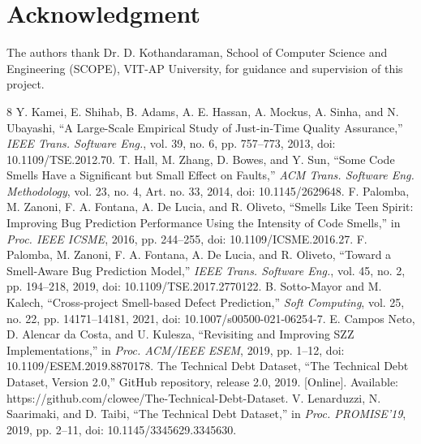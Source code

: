 \documentclass[conference]{IEEEtran}
\begin{document}
\section*{Acknowledgment}
The authors thank Dr. D. Kothandaraman, School of Computer Science and Engineering (SCOPE), VIT-AP University, for guidance and supervision of this project.

\begin{thebibliography}{8}
 Y. Kamei, E. Shihab, B. Adams, A. E. Hassan, A. Mockus, A. Sinha, and N. Ubayashi, ``A Large-Scale Empirical Study of Just-in-Time Quality Assurance,'' \emph{IEEE Trans. Software Eng.}, vol. 39, no. 6, pp. 757--773, 2013, doi: 10.1109/TSE.2012.70.
 T. Hall, M. Zhang, D. Bowes, and Y. Sun, ``Some Code Smells Have a Significant but Small Effect on Faults,'' \emph{ACM Trans. Software Eng. Methodology}, vol. 23, no. 4, Art. no. 33, 2014, doi: 10.1145/2629648.
 F. Palomba, M. Zanoni, F. A. Fontana, A. De Lucia, and R. Oliveto, ``Smells Like Teen Spirit: Improving Bug Prediction Performance Using the Intensity of Code Smells,'' in \emph{Proc. IEEE ICSME}, 2016, pp. 244--255, doi: 10.1109/ICSME.2016.27.
 F. Palomba, M. Zanoni, F. A. Fontana, A. De Lucia, and R. Oliveto, ``Toward a Smell-Aware Bug Prediction Model,'' \emph{IEEE Trans. Software Eng.}, vol. 45, no. 2, pp. 194--218, 2019, doi: 10.1109/TSE.2017.2770122.
 B. Sotto-Mayor and M. Kalech, ``Cross-project Smell-based Defect Prediction,'' \emph{Soft Computing}, vol. 25, no. 22, pp. 14171--14181, 2021, doi: 10.1007/s00500-021-06254-7.
 E. Campos Neto, D. Alencar da Costa, and U. Kulesza, ``Revisiting and Improving SZZ Implementations,'' in \emph{Proc. ACM/IEEE ESEM}, 2019, pp. 1--12, doi: 10.1109/ESEM.2019.8870178.
 The Technical Debt Dataset, ``The Technical Debt Dataset, Version 2.0,'' GitHub repository, release 2.0, 2019. [Online]. Available: https://github.com/clowee/The-Technical-Debt-Dataset.
 V. Lenarduzzi, N. Saarimaki, and D. Taibi, ``The Technical Debt Dataset,'' in \emph{Proc. PROMISE'19}, 2019, pp. 2--11, doi: 10.1145/3345629.3345630.
\end{thebibliography}
\end{document}
